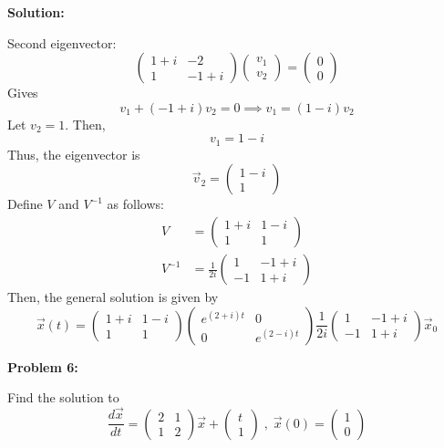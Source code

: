 \documentclass[12pt]{article}
\newenvironment{problem}[1]{
    \textbf{Problem #1:}
}{
    \rmfamily \vspace{1em}
}
\newenvironment{solution}{
    \textbf{Solution:}
    
}{
    
    \vspace{2em}
}
\begin{document}
\begin{solution}
    Second eigenvector:
    \[
        \begin{pmatrix} 1 + i & -2 \\ 1 & -1+i \end{pmatrix} \begin{pmatrix} v_1 \\ v_2 \end{pmatrix} = \begin{pmatrix} 0 \\ 0 \end{pmatrix}
    \]
    Gives
    \[
        v_1 + (-1 + i)v_2 = 0 \implies v_1 = (1 - i)v_2
    \]
    Let \(v_2 = 1\). Then,
    \[
        v_1 = 1 - i
    \]
    Thus, the eigenvector is
    \[
        \vec{v}_2 = \begin{pmatrix} 1 - i \\ 1 \end{pmatrix}
    \]
    Define \(V\) and \(V^{-1}\) as follows:
    \[
        \begin{aligned}
            V &= \begin{pmatrix} 1 + i & 1 - i \\ 1 & 1 \end{pmatrix} \\
            V^{-1} &= \frac{1}{2i}\begin{pmatrix} 1 & -1 + i \\ -1 & 1 + i \end{pmatrix}
        \end{aligned}
    \]
    Then, the general solution is given by
    \[
        \vec{x}(t) = \begin{pmatrix} 1 + i & 1 - i \\ 1 & 1 \end{pmatrix} \begin{pmatrix} e^{(2+i)t} & 0 \\ 0 & e^{(2-i)t} \end{pmatrix} \frac{1}{2i}\begin{pmatrix} 1 & -1 + i \\ -1 & 1 + i \end{pmatrix} \vec{x}_0
    \]
\end{solution}

\newpage

\begin{problem}{6}
    Find the solution to
    \[
        \frac{d\vec{x}}{dt} = \begin{pmatrix} 2 & 1 \\ 1 & 2 \end{pmatrix}\vec{x} + \begin{pmatrix} t \\ 1 \end{pmatrix} \;,\;\vec{x}(0) = \begin{pmatrix} 1 \\ 0 \end{pmatrix}
    \]
\end{problem}
\end{document}
